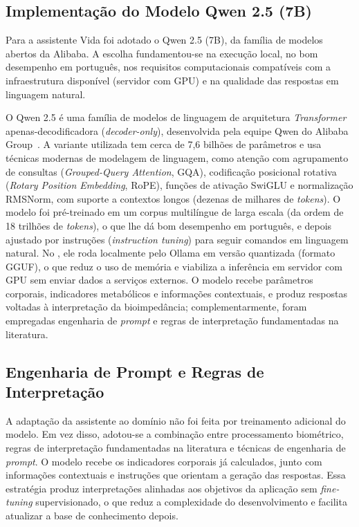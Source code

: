 \subsection{Implementação do Modelo Qwen 2.5 (7B)}
\label{sec:qwen}

Para a assistente Vida foi adotado o Qwen 2.5 (7B), da família de modelos abertos da
Alibaba. A escolha fundamentou-se na execução local, no bom desempenho em português, nos
requisitos computacionais compatíveis com a infraestrutura disponível (servidor com GPU) e
na qualidade das respostas em linguagem natural.

O Qwen 2.5 é uma família de modelos de linguagem de arquitetura \emph{Transformer}
apenas-decodificadora (\emph{decoder-only}), desenvolvida pela equipe Qwen do Alibaba
Group~\cite{qwen2024,bai2023}. A variante utilizada tem cerca de 7,6 bilhões de parâmetros e
usa técnicas modernas de modelagem de linguagem, como atenção com agrupamento de consultas
(\emph{Grouped-Query Attention}, GQA), codificação posicional rotativa (\emph{Rotary
Position Embedding}, RoPE), funções de ativação SwiGLU e normalização RMSNorm, com
suporte a contextos longos (dezenas de milhares de \emph{tokens}). O modelo foi
pré-treinado em um corpus multilíngue de larga escala (da ordem de 18 trilhões de
\emph{tokens}), o que lhe dá bom desempenho em português, e depois ajustado por instruções
(\emph{instruction tuning}) para seguir comandos em linguagem natural. No \sintonia, ele
roda localmente pelo Ollama em versão quantizada (formato GGUF), o que reduz o uso de
memória e viabiliza a inferência em servidor com GPU sem enviar dados a serviços externos. O
modelo recebe parâmetros corporais, indicadores metabólicos e informações contextuais, e
produz respostas voltadas à interpretação da bioimpedância; complementarmente, foram
empregadas engenharia de \emph{prompt} e regras de interpretação fundamentadas na
literatura.

\subsection{Engenharia de Prompt e Regras de Interpretação}

A adaptação da assistente ao domínio não foi feita por treinamento adicional do modelo. Em vez
disso, adotou-se a combinação entre processamento biométrico, regras de interpretação
fundamentadas na literatura e técnicas de engenharia de \emph{prompt}. O modelo recebe os
indicadores corporais já calculados, junto com informações contextuais e instruções que
orientam a geração das respostas. Essa estratégia produz interpretações alinhadas aos
objetivos da aplicação sem \emph{fine-tuning} supervisionado, o que reduz a complexidade do
desenvolvimento e facilita atualizar a base de conhecimento depois.

